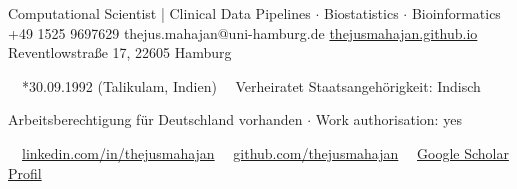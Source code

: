 \documentclass{thejus_cv}
\begin{document}
         {Computational Scientist | Clinical Data Pipelines $\cdot$ Biostatistics $\cdot$ Bioinformatics}
         {+49 1525 9697629}
         {thejus.mahajan@uni-hamburg.de}
         {\href{https://thejusmahajan.github.io}{thejusmahajan.github.io}}
         {Reventlowstra{\ss}e 17, 22605 Hamburg}

\vspace{-1.45cm}
{\small\color{white}
\faCalendar\ \ *30.09.1992 (Talikulam, Indien) \hspace{0.5cm} \faUser\ \ Verheiratet \hspace{0.5cm} Staatsangeh\"origkeit: Indisch
}\par
\vspace{0.1cm}
{\small\color{white}
Arbeitsberechtigung f\"ur Deutschland vorhanden $\cdot$ Work authorisation: yes
}\par
\vspace{0.1cm}
{\small\color{white}
\faLinkedin\ \ \href{https://www.linkedin.com/in/thejusmahajan/}{linkedin.com/in/thejusmahajan}
\hspace{0.5cm}
\faGithub\ \ \href{https://github.com/thejusmahajan}{github.com/thejusmahajan}
\hspace{0.5cm}
\faGraduationCap\ \ \href{https://scholar.google.com/citations?user=PJkZwAwAAAAJ}{Google Scholar Profil}
}\par
\vspace{0.1cm}
\end{document}
